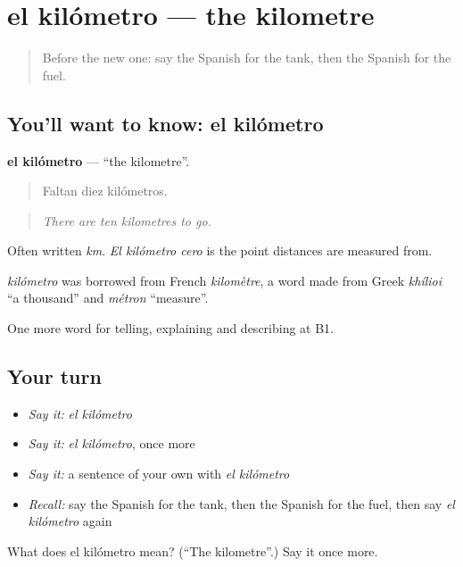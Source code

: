 \section[el kilómetro]{el kilómetro — the kilometre}

\label{lesson:ES-C646-kilometro}



\begin{quote}
Before the new one: say the Spanish for the tank, then the Spanish for the fuel.
\end{quote}

\subsection*{You'll want to know: el kilómetro}
\textbf{el kilómetro} — \textquotedblleft{}the kilometre\textquotedblright{}.

\begin{quote}
Faltan diez kilómetros.
\end{quote}

\begin{quote}
\emph{There are ten kilometres to go.}
\end{quote}

Often written \emph{km}. \emph{El kilómetro cero} is the point distances are measured from.

\begin{cousinweb}
\emph{kilómetro} was borrowed from French \emph{kilomètre}, a word made from Greek \emph{khílioi} \textquotedblleft{}a thousand\textquotedblright{} and \emph{métron} \textquotedblleft{}measure\textquotedblright{}.
\end{cousinweb}

\begin{grammarlens}[title={What you've built}]
One more word for telling, explaining and describing at B1.
\end{grammarlens}

\subsection*{Your turn}
\begin{itemize}
\raggedright
  \item \emph{Say it:} \emph{el kilómetro}
  \item \emph{Say it:} \emph{el kilómetro}, once more
  \item \emph{Say it:} a sentence of your own with \emph{el kilómetro}
  \item \emph{Recall:} say the Spanish for the tank, then the Spanish for the fuel, then say \emph{el kilómetro} again
\end{itemize}

\begin{tcolorbox}[breakable,colback=teal!4,colframe=teal!35!black,title={Before you move on}]
What does el kilómetro mean? (\textquotedblleft{}The kilometre\textquotedblright{}.) Say it once more.
\end{tcolorbox}
